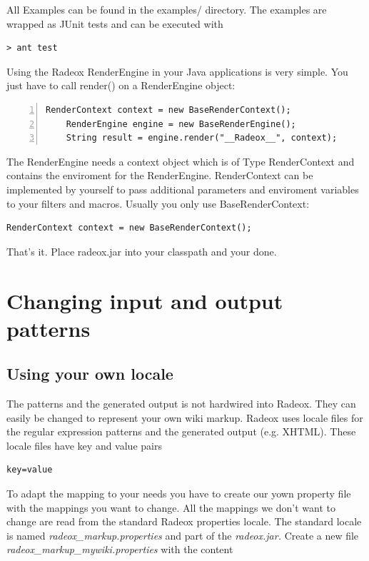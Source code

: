 \documentclass[a4paper,pdftex]{article}
\begin{document}
All Examples can be found in the examples/ directory. The examples are wrapped
as JUnit tests and can be executed with

\begin{verbatim}
> ant test
\end{verbatim}

Using the Radeox RenderEngine in your Java applications is very simple. You just have to call render() on a RenderEngine object:

\begin{Verbatim}[gobble=4,frame=single,numbers=left,fontsize=\small]
    RenderContext context = new BaseRenderContext();
    RenderEngine engine = new BaseRenderEngine();
    String result = engine.render("__Radeox__", context);
\end{Verbatim}

The RenderEngine needs a context object which is of Type RenderContext and contains the enviroment for the RenderEngine. RenderContext can be
implemented by yourself to pass additional parameters and enviroment variables to your filters and macros. Usually you
only use BaseRenderContext:

\begin{verbatim}
RenderContext context = new BaseRenderContext();
\end{verbatim}

That's it. Place radeox.jar into your classpath and your done.

\section{Changing input and output patterns}

\subsection{Using your own locale}

The patterns and the generated output
is not hardwired into Radeox. They can easily be changed to represent
your own wiki markup. Radeox uses locale files for the regular expression patterns and the
generated output (e.g. XHTML). These locale files have key and value pairs

\begin{verbatim}
key=value
\end{verbatim}

To adapt the mapping to your needs you have to create our yown property file
with the mappings  you want to change. All the mappings we don't want to change
are read from the standard Radeox properties locale. The standard
locale is named \textit{radeox\_markup.properties} and part of the\textit{ radeox.jar.}
Create a new file \textit{radeox\_markup\_mywiki.properties}  with the content
\end{document}
